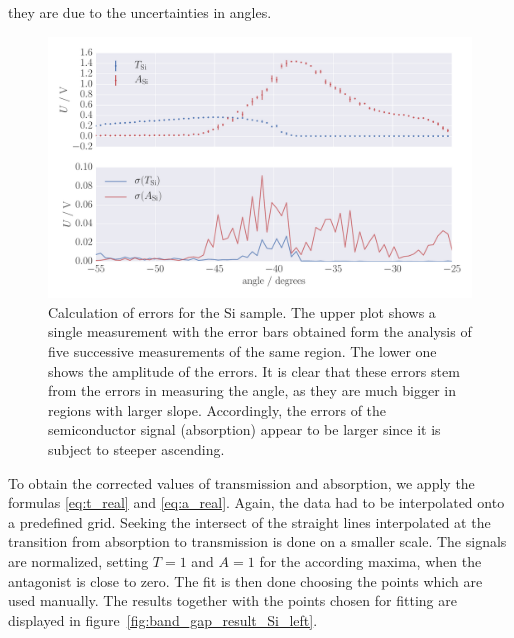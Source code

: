 they are due to the uncertainties in angles. 
\begin{figure}[htpb]
    \centering
    \includegraphics[width=1.0\linewidth]{figures/band_gap_error}
    \caption{
        Calculation of errors for the Si sample. The upper plot shows a single 
        measurement with the error bars obtained form the analysis of five successive 
        measurements of the same region. The lower one shows the amplitude of the errors. 
        It is clear that these errors stem from the errors in measuring the angle, 
        as they are much bigger in regions with larger slope. 
        Accordingly, the errors of the semiconductor signal (absorption)  appear 
        to be larger since it is subject to steeper ascending. 
        }
    \label{fig:band_gap_error}
\end{figure}
To obtain the corrected values of transmission and absorption, 
we apply the formulas \eqref{eq:t_real} and \eqref{eq:a_real}.
Again, the data had to be interpolated onto a predefined grid.
Seeking the intersect of the straight lines interpolated at the transition from 
absorption to transmission is done on a smaller scale. The
signals are normalized, setting $T = 1$ and $A = 1$ for the according maxima, 
when the antagonist is close to zero. The fit is then done choosing the 
points which are used manually. The results together with the points chosen for fitting 
are displayed in figure~\ref{fig:band_gap_result_Si_left}. 
